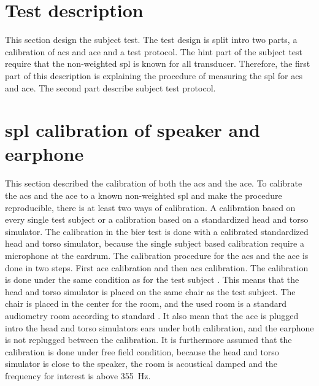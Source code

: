

\section{Test description}
\label{sec:test_description}
This section design the subject test. The test design is split intro two parts, a calibration of \gls{acs} and \gls{ace} and a test protocol. The \gls{hint} part of the subject test require that the non-weighted \gls{spl} is known for all transducer. Therefore, the first part of this description is explaining the procedure of measuring the \gls{spl} for \gls{acs} and \gls{ace}. The second part describe subject test protocol.





\section{\gls{spl} calibration of speaker and earphone}
This section described the calibration of both the \gls{acs} and the \gls{ace}. To calibrate the \gls{acs} and the \gls{ace} to a known non-weighted \gls{spl} and make the procedure reproducible, there is at least two ways of calibration. A calibration based on every single test subject or a calibration based on a standardized head and torso simulator. The calibration in the \gls{bier} test is done with a calibrated standardized head and torso simulator, because the single subject based calibration require a microphone at the eardrum. The calibration procedure for the \gls{acs} and the \gls{ace} is done in two steps. First \gls{ace} calibration and then \gls{acs} calibration. The calibration is done under the same condition as for the test subject . This means that the head and torso simulator is placed on the same chair as the test subject. The chair is placed in the center for the room, and the used room is a standard audiometry room according to standard \citep{iso_8253-2}. It also mean that the \gls{ace} is plugged intro the head and torso simulators ears under both calibration, and the earphone is not replugged between the calibration. It is furthermore assumed that the calibration is done under free field condition, because the head and torso simulator is close to the speaker, the room is acoustical damped and the frequency for interest is above \SI{355}{\hertz}. 

